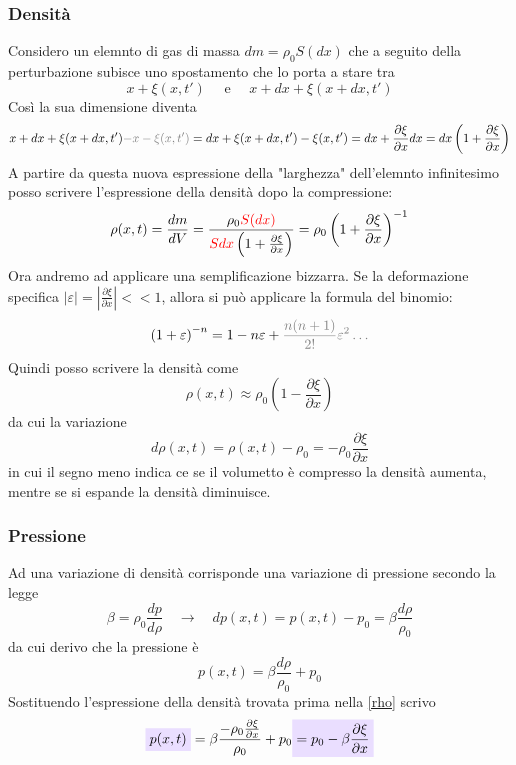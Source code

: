 \documentclass[x11names]{report}
\newcommand{\viola}[1]{\colorbox{yred}{$\displaystyle #1$}}
\begin{document}
	\subsubsection{Densità}
	Considero un elemnto di gas di massa \(dm = \rho_0S(dx)\) che a seguito della perturbazione subisce uno spostamento che lo porta a stare tra
	\[
	x + \xi(x,t') \quad \text{ e } \quad x + dx + \xi(x + dx,t')
	\]
	Così la sua dimensione diventa
	\[
	x + dx + \xi(x + dx,t') \textcolor{gray}{-x - \xi(x,t')} = dx + \xi(x + dx,t')- \xi(x,t') = dx + \frac{\partial \xi}{\partial x}dx = dx\left(1 + \frac{\partial \xi}{\partial x}\right)
	\]
	A partire da questa nuova espressione della "larghezza" dell'elemnto infinitesimo posso scrivere l'espressione della densità dopo la compressione:
	\[
	\rho(x,t) = \frac{dm}{dV} = \frac{\rho_0 \textcolor{red}{S (dx)}}{\textcolor{red}{Sdx}\left(1 + \frac{\partial \xi}{\partial x}\right)} = \rho_0\left(1 + \frac{\partial \xi}{\partial x}\right)^{-1}
	\]
	Ora andremo ad applicare una semplificazione bizzarra. Se la deformazione specifica $|\varepsilon| = \left|\frac{\partial \xi}{\partial x}\right|<< 1$, allora si può applicare la formula del binomio:
	\[
	\left(1 + \varepsilon\right)^{-n} = 1 - n\varepsilon + \textcolor{gray}{\frac{n(n+1)}{2!}\varepsilon^2\dots}
	\]
	Quindi posso scrivere la densità come
	\[
	\rho(x,t) \approx \rho_0\left(1 - \frac{\partial \xi}{\partial x}\right)
	\]
	da cui la variazione
	\begin{equation} \label{rho}
		d\rho(x,t) = \rho(x,t) - \rho_0 = - \rho_0\frac{\partial \xi}{\partial x}
	\end{equation}
	in cui il segno meno indica ce se il volumetto è compresso la densità aumenta, mentre se si espande la densità diminuisce.
	
	\subsubsection{Pressione}
	Ad una variazione di densità corrisponde una variazione di pressione secondo la legge
	\[
	\beta = \rho_0\frac{dp}{d\rho} \quad \to \quad dp(x,t) = p(x,t) - p_0 = \beta\frac{d\rho}{\rho_0}
	\]
	da cui derivo che la pressione è 
	\[
	p(x,t) = \beta\frac{d\rho}{\rho_0} +  p_0 
	\]
	Sostituendo l'espressione della densità trovata prima nella \ref{rho} scrivo
	\begin{equation}\label{1press}
		\viola{p(x,t)} = \beta\frac{- \rho_0\frac{\partial \xi}{\partial x}}{\rho_0} +  p_0 \viola{=p_0 - \beta\frac{\partial \xi}{\partial x}}
	\end{equation}
\end{document}
